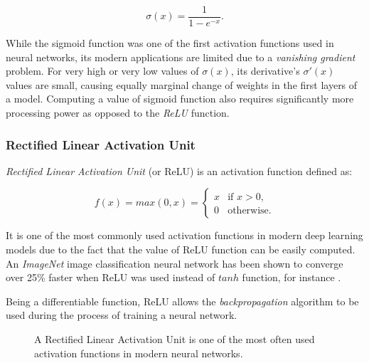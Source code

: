 \begin{equation}
\sigma(x) = \frac{1}{1-e^{-x}}.
\end{equation}

While the sigmoid function was one of the first activation functions used in neural networks, its modern applications are limited due to a \emph{vanishing gradient} problem. For very high or very low values of $\sigma(x)$, its derivative's $\sigma '(x)$ values are small, causing equally marginal change of weights in the first layers of a model. Computing a value of sigmoid function also requires significantly more processing power as opposed to the \emph{ReLU} function.


\subsubsection{Rectified Linear Activation Unit}

\emph{Rectified Linear Activation Unit} (or ReLU) is an activation function defined as:

\begin{equation}
f(x) = max(0, x) = \begin{cases}
    x & \text{if } x > 0, \\
    0 & \text{otherwise}.
\end{cases}
\end{equation}

It is one of the most commonly used activation functions in modern deep learning models \cite{relu_def} due to the fact that the value of ReLU function can be easily computed. An \emph{ImageNet} image classification neural network has been shown to converge over 25\% faster when ReLU was used instead of $tanh$ function, for instance \cite{relu_speed}.

Being a differentiable function, ReLU allows the \emph{backpropagation} algorithm to be used during the process of training a neural network.

\begin{figure}
\centering
{}
\caption{A Rectified Linear Activation Unit is one of the most often used activation functions in modern neural networks.}
\end{figure}


